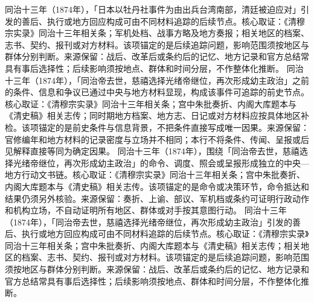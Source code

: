 同治十三年（1874年），「日本以牡丹社事件为由出兵台湾南部，清廷被迫应对」引发的善后、执行或地方回应构成可由不同材料追踪的后续节点。核心取证：《清穆宗实录》同治十三年相关条；军机处档、战事方略及地方奏报；相关地区的档案、志书、契约、报刊或对方材料。该项锚定的是后续追踪问题，影响范围须按地区与群体分别判断。来源保留：战后、改革后或条约后的记忆、地方记录和官方总结常具有事后选择性；后续影响须按地点、群体和时间分层，不作整体化推断。
同治十三年（1874年），「同治帝去世，慈禧选择光绪帝继位，再次形成幼主政治」之前的条件、信息和争议已通过中央与地方材料显现，构成该事件可追踪的前史节点。核心取证：《清穆宗实录》同治十三年相关条；宫中朱批奏折、内阁大库题本与《清史稿》相关志传；同时期地方档案、地方志、日记或对方材料应按具体地区补检。该项锚定的是前史条件与信息背景，不把条件直接写成唯一因果。来源保留：官修编年和地方材料的记录密度与立场并不相同；本行不将条件、传闻、呈报或后见解释直接等同为确定因果。
同治十三年（1874年），围绕「同治帝去世，慈禧选择光绪帝继位，再次形成幼主政治」的命令、调度、照会或呈报形成独立的中央—地方行动文书链。核心取证：《清穆宗实录》同治十三年相关条；宫中朱批奏折、内阁大库题本与《清史稿》相关志传。该项锚定的是命令或决策环节，命令抵达和结果仍须另外核验。来源保留：奏折、上谕、部议、军机档或条约可证明行政动作和机构立场，不自动证明所有地区、群体或对手按其意图行动。
同治十三年（1874年），「同治帝去世，慈禧选择光绪帝继位，再次形成幼主政治」引发的善后、执行或地方回应构成可由不同材料追踪的后续节点。核心取证：《清穆宗实录》同治十三年相关条；宫中朱批奏折、内阁大库题本与《清史稿》相关志传；相关地区的档案、志书、契约、报刊或对方材料。该项锚定的是后续追踪问题，影响范围须按地区与群体分别判断。来源保留：战后、改革后或条约后的记忆、地方记录和官方总结常具有事后选择性；后续影响须按地点、群体和时间分层，不作整体化推断。
